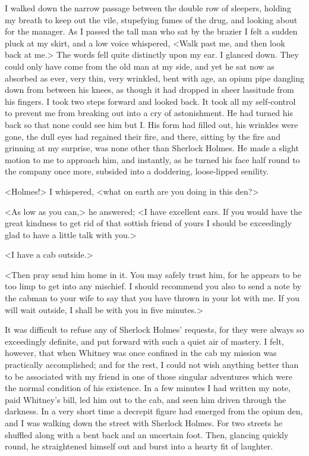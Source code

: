 I walked down the narrow passage between the double row of sleepers, holding my breath to keep out the vile, stupefying fumes of the drug, and looking about for the manager. As I passed the tall man who sat by the brazier I felt a sudden pluck at my skirt, and a low voice whispered, <Walk past me, and then look back at me.> The words fell quite distinctly upon my ear. I glanced down. They could only have come from the old man at my side, and yet he sat now as absorbed as ever, very thin, very wrinkled, bent with age, an opium pipe dangling down from between his knees, as though it had dropped in sheer lassitude from his fingers. I took two steps forward and looked back. It took all my self-control to prevent me from breaking out into a cry of astonishment. He had turned his back so that none could see him but I\@. His form had filled out, his wrinkles were gone, the dull eyes had regained their fire, and there, sitting by the fire and grinning at my surprise, was none other than Sherlock Holmes. He made a slight motion to me to approach him, and instantly, as he turned his face half round to the company once more, subsided into a doddering, loose-lipped senility.

<Holmes!> I whispered, <what on earth are you doing in this den?>

<As low as you can,> he answered; <I have excellent ears. If you would have the great kindness to get rid of that sottish friend of yours I should be exceedingly glad to have a little talk with you.>

<I have a cab outside.>

<Then pray send him home in it. You may safely trust him, for he appears to be too limp to get into any mischief. I should recommend you also to send a note by the cabman to your wife to say that you have thrown in your lot with me. If you will wait outside, I shall be with you in five minutes.>

It was difficult to refuse any of Sherlock Holmes' requests, for they were always so exceedingly definite, and put forward with such a quiet air of mastery. I felt, however, that when Whitney was once confined in the cab my mission was practically accomplished; and for the rest, I could not wish anything better than to be associated with my friend in one of those singular adventures which were the normal condition of his existence. In a few minutes I had written my note, paid Whitney's bill, led him out to the cab, and seen him driven through the darkness. In a very short time a decrepit figure had emerged from the opium den, and I was walking down the street with Sherlock Holmes. For two streets he shuffled along with a bent back and an uncertain foot. Then, glancing quickly round, he straightened himself out and burst into a hearty fit of laughter.


